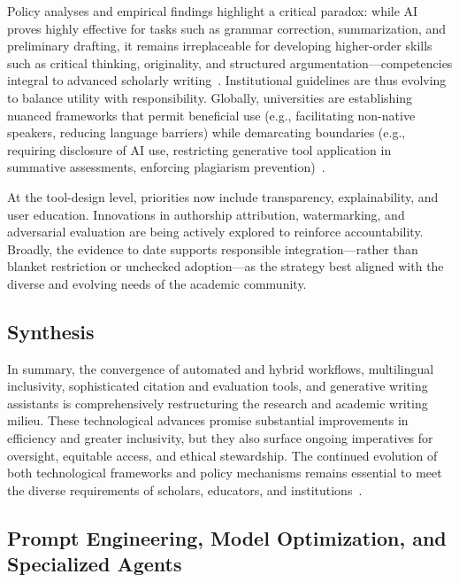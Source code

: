 \documentclass[sigconf]{acmart}
\begin{document}
Policy analyses and empirical findings highlight a critical paradox: while AI proves highly effective for tasks such as grammar correction, summarization, and preliminary drafting, it remains irreplaceable for developing higher-order skills such as critical thinking, originality, and structured argumentation—competencies integral to advanced scholarly writing~\cite{ref104,ref109,ref110}. Institutional guidelines are thus evolving to balance utility with responsibility. Globally, universities are establishing nuanced frameworks that permit beneficial use (e.g., facilitating non-native speakers, reducing language barriers) while demarcating boundaries (e.g., requiring disclosure of AI use, restricting generative tool application in summative assessments, enforcing plagiarism prevention)~\cite{ref104,ref110}.

At the tool-design level, priorities now include transparency, explainability, and user education. Innovations in authorship attribution, watermarking, and adversarial evaluation are being actively explored to reinforce accountability. Broadly, the evidence to date supports responsible integration—rather than blanket restriction or unchecked adoption—as the strategy best aligned with the diverse and evolving needs of the academic community.

\subsection{Synthesis}

In summary, the convergence of automated and hybrid workflows, multilingual inclusivity, sophisticated citation and evaluation tools, and generative writing assistants is comprehensively restructuring the research and academic writing milieu. These technological advances promise substantial improvements in efficiency and greater inclusivity, but they also surface ongoing imperatives for oversight, equitable access, and ethical stewardship. The continued evolution of both technological frameworks and policy mechanisms remains essential to meet the diverse requirements of scholars, educators, and institutions~\cite{ref10,ref11,ref12,ref28,ref29,ref30,ref31,ref35,ref36,ref37,ref38,ref39,ref46,ref47,ref49,ref51,ref62,ref76,ref80,ref86,ref88,ref89,ref90,ref91,ref92,ref93,ref94,ref96,ref97,ref98,ref100,ref102,ref104,ref105,ref107,ref108,ref109,ref110}.

\subsection{Prompt Engineering, Model Optimization, and Specialized Agents}
\end{document}
